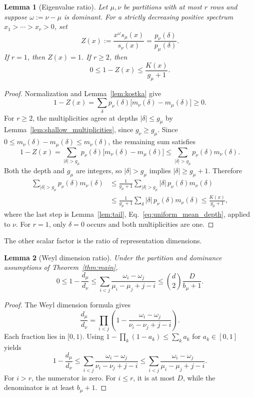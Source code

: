 \documentclass[a4paper,onecolumn,11pt]{quantumarticle}
\newtheorem{lem}{Lemma}
\begin{document}
\begin{lem}[Eigenvalue ratio]\label{lem:ratio}
Let $\mu,\nu$ be partitions with at most $r$ rows and suppose
$\omega:=\nu-\mu$ is dominant. For a strictly decreasing positive
spectrum $x_1>\cdots>x_r>0$, set
\[
Z(x):=\frac{x^\omega s_\mu(x)}{s_\nu(x)}
=\frac{p_\nu(\delta)}{p_\mu(\delta)}.
\]
If $r=1$, then $Z(x)=1$. If $r\ge2$, then
\[
0\le1-Z(x)\le\frac{K(x)}{g_\mu+1}.
\]
\end{lem}
\begin{proof}
Normalization and Lemma~\ref{lem:kostka} give
\[
1-Z(x)
=\sum_\delta p_\nu(\delta)
\bigl[m_\nu(\delta)-m_\mu(\delta)\bigr]\ge0.
\]
For $r\ge2$, the multiplicities agree at depths $|\delta|\le g_\mu$
by Lemma~\ref{lem:shallow_multiplicities}, since $g_\nu\ge g_\mu$.
Since $0\le m_\nu(\delta)-m_\mu(\delta)\le m_\nu(\delta)$,
the remaining sum satisfies
\[
1-Z(x)
=\sum_{|\delta|>g_\mu}p_\nu(\delta)
\bigl[m_\nu(\delta)-m_\mu(\delta)\bigr]
\le\sum_{|\delta|>g_\mu}p_\nu(\delta)m_\nu(\delta).
\]
Both the depth and $g_\mu$ are integers, so $|\delta|>g_\mu$
implies $|\delta|\ge g_\mu+1$. Therefore
\begin{align*}
\sum_{|\delta|>g_\mu}p_\nu(\delta)m_\nu(\delta)
&\le\frac{1}{g_\mu+1}
\sum_{|\delta|>g_\mu}|\delta|\,p_\nu(\delta)m_\nu(\delta)\\
&\le\frac{1}{g_\mu+1}
\sum_\delta|\delta|\,p_\nu(\delta)m_\nu(\delta)
\le\frac{K(x)}{g_\mu+1},
\end{align*}
where the last step is Lemma~\ref{lem:tail},
Eq.~\eqref{eq:uniform_mean_depth}, applied to $\nu$.
For $r=1$, only $\delta=0$ occurs and both multiplicities are one.
\end{proof}

The other scalar factor is the ratio of representation dimensions.

\begin{lem}[Weyl dimension ratio]\label{lem:dim_ratio}
Under the partition and dominance assumptions of
Theorem~\ref{thm:main},
\[
0\le1-\frac{d_\mu}{d_\nu}
\le\sum_{i<j}
\frac{\omega_i-\omega_j}{\mu_i-\mu_j+j-i}
\le\binom d2\frac{D}{b_\mu+1}.
\]
\end{lem}
\begin{proof}
The Weyl dimension formula gives
\[
\frac{d_\mu}{d_\nu}
=\prod_{i<j}\left(1-
\frac{\omega_i-\omega_j}{\nu_i-\nu_j+j-i}\right).
\]
Each fraction lies in $[0,1)$. Using
$1-\prod_k(1-a_k)\le\sum_k a_k$ for $a_k\in[0,1]$ yields
\[
1-\frac{d_\mu}{d_\nu}
\le\sum_{i<j}\frac{\omega_i-\omega_j}{\nu_i-\nu_j+j-i}
\le\sum_{i<j}\frac{\omega_i-\omega_j}{\mu_i-\mu_j+j-i}.
\]
For $i>r$, the numerator is zero. For $i\le r$, it is at most $D$,
while the denominator is at least $b_\mu+1$.
\end{proof}
\end{document}
